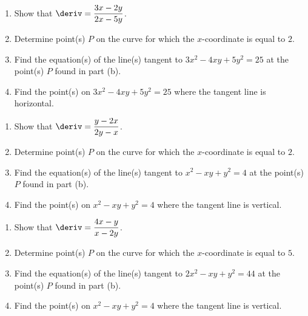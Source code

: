 \begin{enumerate}[label=\hspace{11pt}(\alph*), align=left, leftmargin=*, labelsep=0.25em]
    \item Show that $\deriv = \dfrac{3x - 2y}{2x - 5y}$.
    \item Determine point(s) $P$ on the curve for which the $x$-coordinate is equal to $2$.
    \item Find the equation(s) of the line(s) tangent to $3x^2 - 4xy + 5y^2 = 25$ at the point(s) $P$ found in part (b).
    \item Find the point(s) on $3x^2 - 4xy + 5y^2 = 25$ where the tangent line is horizontal.
\end{enumerate} \vspace{11pt}

\begin{enumerate}[label=\hspace{11pt}(\alph*), align=left, leftmargin=*, labelsep=0.25em]
    \item Show that $\deriv = \dfrac{y - 2x}{2y - x}$.
    \item Determine point(s) $P$ on the curve for which the $x$-coordinate is equal to $2$.
    \item Find the equation(s) of the line(s) tangent to $x^2 - xy + y^2 = 4$ at the point(s) $P$ found in part (b).
    \item Find the point(s) on $x^2 - xy + y^2 = 4$ where the tangent line is vertical.
\end{enumerate} \vspace{11pt}

\begin{enumerate}[label=\hspace{11pt}(\alph*), align=left, leftmargin=*, labelsep=0.25em]
    \item Show that $\deriv = \dfrac{4x - y}{x - 2y}$.
    \item Determine point(s) $P$ on the curve for which the $x$-coordinate is equal to $5$.
    \item Find the equation(s) of the line(s) tangent to $2x^2 - xy + y^2 = 44$ at the point(s) $P$ found in part (b).
    \item Find the point(s) on $x^2 - xy + y^2 = 4$ where the tangent line is vertical.
\end{enumerate} \vspace{11pt}

